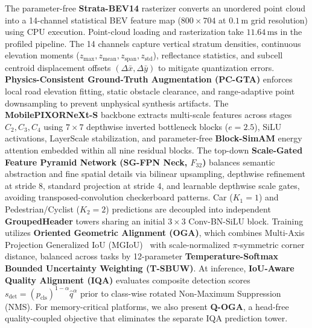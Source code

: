 The parameter-free \textbf{Strata-BEV14} rasterizer converts an unordered point cloud into a 14-channel statistical BEV feature map ($800 \times 704$ at $0.1\,\text{m}$ grid resolution) using CPU execution. Point-cloud loading and rasterization take $11.64\,\text{ms}$ in the profiled pipeline. The 14 channels capture vertical stratum densities, continuous elevation moments ($z_{\max}, z_{\mathrm{mean}}, z_{\mathrm{span}}, z_{\mathrm{std}}$), reflectance statistics, and subcell centroid displacement offsets $(\Delta\bar{x}, \Delta\bar{y})$ to mitigate quantization errors. \textbf{Physics-Consistent Ground-Truth Augmentation (PC-GTA)} enforces local road elevation fitting, static obstacle clearance, and range-adaptive point downsampling to prevent unphysical synthesis artifacts. The \textbf{MobilePIXORNeXt-S} backbone extracts multi-scale features across stages $C_2, C_3, C_4$ using $7 \times 7$ depthwise inverted bottleneck blocks ($e=2.5$), SiLU activations, LayerScale stabilization, and parameter-free \textbf{Block-SimAM} energy attention embedded within all nine residual blocks. The top-down \textbf{Scale-Gated Feature Pyramid Network (SG-FPN Neck, $F_{32}$)} balances semantic abstraction and fine spatial details via bilinear upsampling, depthwise refinement at stride 8, standard projection at stride 4, and learnable depthwise scale gates, avoiding transposed-convolution checkerboard patterns. Car ($K_1=1$) and Pedestrian/Cyclist ($K_2=2$) predictions are decoupled into independent \textbf{GroupedHeader} towers sharing an initial $3 \times 3$ Conv-BN-SiLU block. Training utilizes \textbf{Oriented Geometric Alignment (OGA)}, which combines Multi-Axis Projection Generalized IoU (MGIoU)~\cite{le2026mgiou} with scale-normalized $\pi$-symmetric corner distance, balanced across tasks by 12-parameter \textbf{Temperature-Softmax Bounded Uncertainty Weighting (T-SBUW)}. At inference, \textbf{IoU-Aware Quality Alignment (IQA)} evaluates composite detection scores $s_{\mathrm{det}} = (p_{\mathrm{cls}})^{1-\alpha} \hat{q}^\alpha$ prior to class-wise rotated Non-Maximum Suppression (NMS). For memory-critical platforms, we also present \textbf{Q-OGA}, a head-free quality-coupled objective that eliminates the separate IQA prediction tower.

